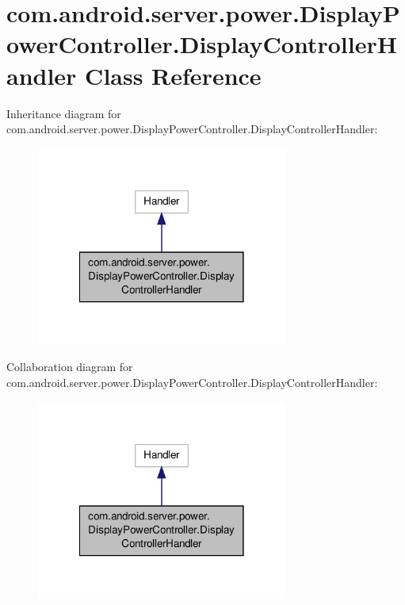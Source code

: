 \hypertarget{classcom_1_1android_1_1server_1_1power_1_1DisplayPowerController_1_1DisplayControllerHandler}{\section{com.\-android.\-server.\-power.\-Display\-Power\-Controller.\-Display\-Controller\-Handler Class Reference}
\label{classcom_1_1android_1_1server_1_1power_1_1DisplayPowerController_1_1DisplayControllerHandler}
}


Inheritance diagram for com.\-android.\-server.\-power.\-Display\-Power\-Controller.\-Display\-Controller\-Handler\-:
\nopagebreak
\begin{figure}[H]
\begin{center}
\leavevmode
\includegraphics[width=234pt]{classcom_1_1android_1_1server_1_1power_1_1DisplayPowerController_1_1DisplayControllerHandler__inherit__graph}
\end{center}
\end{figure}


Collaboration diagram for com.\-android.\-server.\-power.\-Display\-Power\-Controller.\-Display\-Controller\-Handler\-:
\nopagebreak
\begin{figure}[H]
\begin{center}
\leavevmode
\includegraphics[width=234pt]{classcom_1_1android_1_1server_1_1power_1_1DisplayPowerController_1_1DisplayControllerHandler__coll__graph}
\end{center}
\end{figure}
